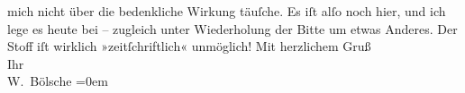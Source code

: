 \begin{ledgroupsized}[t]{13cm}
               mich nicht über die bedenkliche Wirkung täuſche. Es iſt alſo noch hier, und ich lege
               es heute bei – zugleich unter Wiederholung der Bitte um etwas Anderes. Der Stoff iſt wirklich
               »zeitſchriftlich« unmöglich!\pend
           \pstart
           Mit herzlichem Gruß{\\[\baselineskip]}Ihr{\\[\baselineskip]}\spacefill\mbox{W. Bölsche}\pend
           \leftskip=0em{}
         
         \endnumbering{}\end{ledgroupsized}  \newcommand{\dateiname}{L00106}\newcommand{\titel}{Wilhelm Bölsche an Arthur Schnitzler, [24. 7. 1892]}\newcommand{\editorInnen}{Martin Anton Müller und Gerd-Hermann Susen}
      